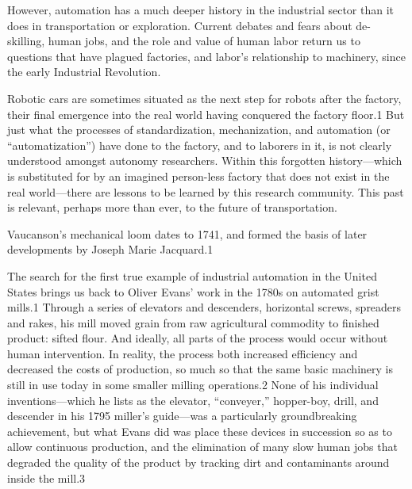 However, automation has a much deeper
history in the industrial sector than it does in transportation or
exploration. Current debates and fears about de-skilling, human jobs,
and the role and value of human labor return us to questions that have
plagued factories, and labor's relationship to machinery, since the
early Industrial Revolution.

Robotic cars are sometimes situated as
the next step for robots after the factory, their final emergence into
the real world having conquered the factory floor.1 But just what the
processes of standardization, mechanization, and automation (or
“automatization”) have done to the factory, and to laborers in it, is
not clearly understood amongst autonomy researchers. Within this
forgotten history—which is substituted for by an imagined person-less
factory that does not exist in the real world—there are lessons to be
learned by this research community. This past is relevant, perhaps
more than ever, to the future of transportation.

 Vaucanson's mechanical loom dates to 1741, and formed the basis of
 later developments by Joseph Marie Jacquard.1

The search for the first true example of industrial automation in the
United States brings us back to Oliver Evans' work in the 1780s on
automated grist mills.1 Through a series of elevators and descenders,
horizontal screws, spreaders and rakes, his mill moved grain from raw
agricultural commodity to finished product: sifted flour. And ideally,
all parts of the process would occur without human intervention. In
reality, the process both increased efficiency and decreased the costs
of production, so much so that the same basic machinery is still in
use today in some smaller milling operations.2 None of his individual
inventions—which he lists as the elevator, “conveyer,” hopper-boy,
drill, and descender in his 1795 miller's guide—was a particularly
groundbreaking achievement, but what Evans did was place these devices
in succession so as to allow continuous production, and the
elimination of many slow human jobs that degraded the quality of the
product by tracking dirt and contaminants around inside the mill.3 

